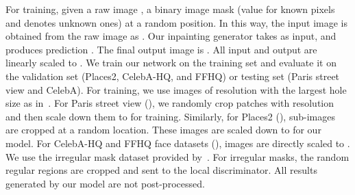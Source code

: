 \documentclass[journal]{IEEEtran}
\begin{document}
For training, given a raw image , a binary image mask  (value  for known pixels and  denotes unknown ones) at a random position. In this way, the input image  is obtained from the raw image as . Our inpainting generator takes  as input, and produces prediction . The final output image is . All input and output are linearly scaled to . We train our network on the training set and evaluate it on the validation set (Places2, CelebA-HQ, and FFHQ) or testing set (Paris street view and CelebA). For training, we use images of resolution  with the largest hole size  as in~\cite{contextual-attention,GMCNN}. For Paris street view (), we randomly crop patches with resolution  and then scale down them to  for training. Similarly, for Places2 (),  sub-images are cropped at a random location. These images are scaled down to  for our model. For CelebA-HQ and FFHQ face datasets (), images are directly scaled to . We use the irregular mask dataset provided by~\cite{partial-convolutions}. For irregular masks, the random regular regions are cropped and sent to the local discriminator. All results generated by our model are not post-processed.
\end{document}
